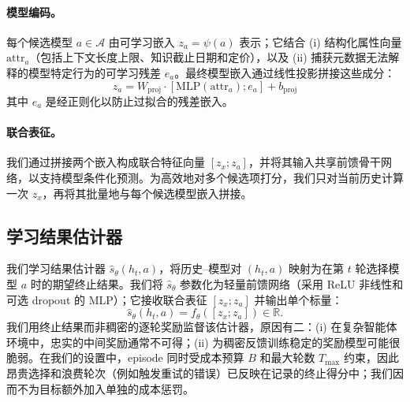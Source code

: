 \paragraph{模型编码。}
每个候选模型 $a \in \mathcal{A}$ 由可学习嵌入 $z_a=\psi(a)$ 表示；它结合 (i) 结构化属性向量 $\text{attr}_a$（包括上下文长度上限、知识截止日期和定价），以及 (ii) 捕获元数据无法解释的模型特定行为的可学习残差 $e_a$。最终模型嵌入通过线性投影拼接这些成分：
\begin{equation}
z_a = W_{\text{proj}} \cdot [\text{MLP}(\text{attr}_a); e_a] + b_{\text{proj}}
\end{equation}
其中 $e_a$ 是经正则化以防止过拟合的残差嵌入。

\paragraph{联合表征。}
我们通过拼接两个嵌入构成联合特征向量 $[z_x;z_a]$，并将其输入共享前馈骨干网络，以支持模型条件化预测。为高效地对多个候选项打分，我们只对当前历史计算一次 $z_x$，再将其批量地与每个候选模型嵌入拼接。

\subsection{学习结果估计器}
\label{sec:learning}

我们学习结果估计器 $\hat{s}_\theta(h_t,a)$，将历史--模型对 $(h_t,a)$ 映射为在第 $t$ 轮选择模型 $a$ 时的期望终止结果。我们将 $\hat{s}_\theta$ 参数化为轻量前馈网络（采用 ReLU 非线性和可选 dropout 的 MLP）；它接收联合表征 $[z_x;z_a]$ 并输出单个标量：
\begin{equation}
\hat{s}_\theta(h_t,a)=f_\theta([z_x;z_a])\in\mathbb{R}.
\end{equation}
我们用终止结果而非稠密的逐轮奖励监督该估计器，原因有二：(i) 在复杂智能体环境中，忠实的中间奖励通常不可得；(ii) 为稠密反馈训练稳定的奖励模型可能很脆弱。在我们的设置中，episode 同时受成本预算 $B$ 和最大轮数 $T_{\max}$ 约束，因此昂贵选择和浪费轮次（例如触发重试的错误）已反映在记录的终止得分中；我们因而不为目标额外加入单独的成本惩罚。

